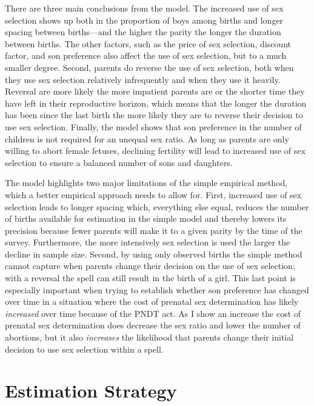 \documentclass[12pt,letterpaper]{article}
\begin{document}
There are three main conclusions from the model.
The increased use of sex selection shows up both in the 
proportion of boys among births and longer spacing between 
births---and the higher the parity the longer the duration between 
births.
The other factors, such as the price of sex selection, 
discount factor, and son preference also affect the use
of sex selection, but to a much smaller degree.
Second, parents do reverse the use of sex selection, 
both when they use sex selection relatively infrequently and when 
they use it heavily.
Reversal are more likely the more impatient parents are or the
shorter time they have left in their reproductive horizon, which
means that the longer the duration has been since the last birth
the more likely they are to reverse their decision to use sex selection.
Finally, the model shows that son preference in the number of
children is not required for an unequal sex ratio.
As long as parents are only willing to abort female fetuses, declining
fertility will lead to increased use of sex selection to ensure 
a balanced number of sons and daughters.


The model highlights two major limitations of the simple 
empirical method, which a better empirical approach needs to 
allow for.
First, increased use of sex selection leads to longer spacing which,
everything else equal, reduces the number of births available for 
estimation in the simple model and thereby lowers its precision
because fewer parents will make it to a given parity by the time of the survey.
Furthermore, the more intensively sex selection is used the larger 
the decline in sample size.
Second, by using only observed births the simple method cannot capture
when parents change their decision on the use of sex selection;
with a reversal the spell can still result in the birth of a girl.
This last point is especially important when trying to establish whether 
son preference has changed over time in a situation where the cost of prenatal 
sex determination has likely \emph{increased} over time because of the PNDT act.
As I show an increase the cost of prenatal sex determination does 
decrease the sex ratio and lower the number of abortions, but 
it also \emph{increases} the likelihood that parents change their initial
decision to use sex selection within a spell.




\section{Estimation Strategy\label{sec:strategy}}
\end{document}

